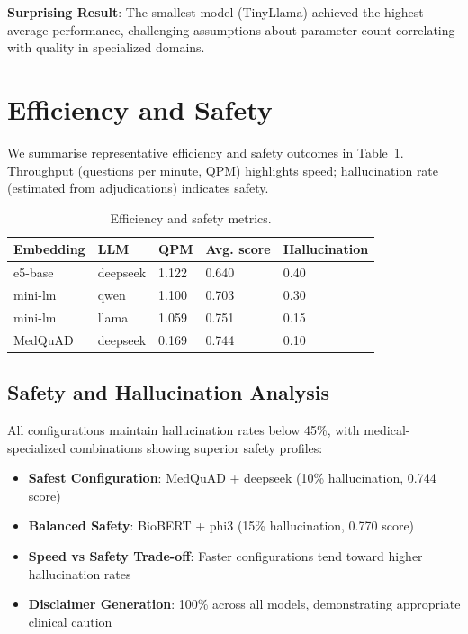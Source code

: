\textbf{Surprising Result}: The smallest model (TinyLlama) achieved the highest average performance, challenging assumptions about parameter count correlating with quality in specialized domains.

\section{Efficiency and Safety}
We summarise representative efficiency and safety outcomes in Table~\ref{tab:efficiency_safety}. Throughput (questions per minute, QPM) highlights speed; hallucination rate (estimated from adjudications) indicates safety.

\begin{table}[!htbp]
\centering
\caption{Efficiency and safety metrics.}
\label{tab:efficiency_safety}
\begin{footnotesize}
\renewcommand\arraystretch{0.95}
\begin{tabularx}{0.9\textwidth}{l l X X X}
  \toprule
  Embedding & LLM & QPM & Avg. score & Hallucination \\
  \midrule
  e5-base & deepseek & 1.122 & 0.640 & 0.40 \\
  mini-lm & qwen & 1.100 & 0.703 & 0.30 \\
  mini-lm & llama & 1.059 & 0.751 & 0.15 \\
  MedQuAD & deepseek & 0.169 & 0.744 & 0.10 \\
  \bottomrule
\end{tabularx}
\end{footnotesize}
\end{table}

\subsection{Safety and Hallucination Analysis}

All configurations maintain hallucination rates below 45\%, with medical-specialized combinations showing superior safety profiles:

\begin{itemize}
    \item \textbf{Safest Configuration}: MedQuAD + deepseek (10\% hallucination, 0.744 score)
    \item \textbf{Balanced Safety}: BioBERT + phi3 (15\% hallucination, 0.770 score)
    \item \textbf{Speed vs Safety Trade-off}: Faster configurations tend toward higher hallucination rates
    \item \textbf{Disclaimer Generation}: 100\% across all models, demonstrating appropriate clinical caution
\end{itemize}

